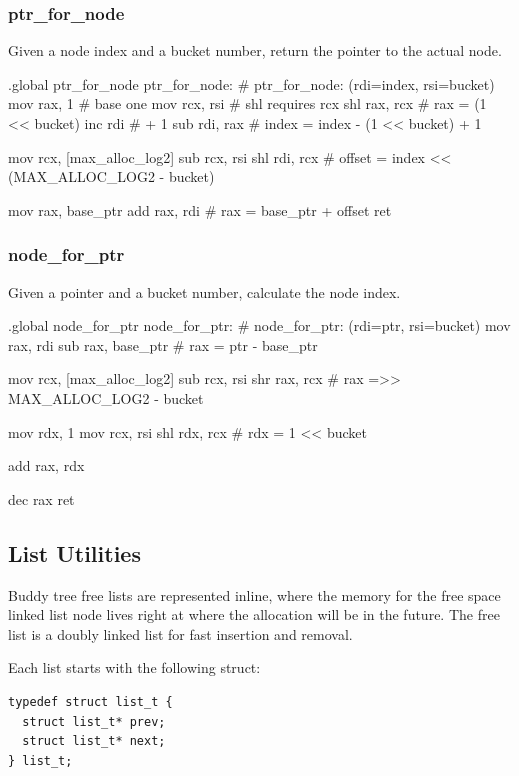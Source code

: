 \subsubsection{ptr\_for\_node}

Given a node index and a bucket number, return the pointer to the actual node.

\begin{asm}
.global ptr_for_node
ptr_for_node:			# ptr_for_node: (rdi=index, rsi=bucket)
	mov	rax, 1		#   base one
	mov	rcx, rsi	#   shl requires rcx
	shl	rax, rcx	#   rax = (1 << bucket)
	inc	rdi  		#   + 1
	sub	rdi, rax	#   index = index - (1 << bucket) + 1

	mov	rcx, [max_alloc_log2]
	sub	rcx, rsi
	shl	rdi, rcx	# offset = index << (MAX_ALLOC_LOG2 - bucket)

	mov	rax, base_ptr
	add	rax, rdi	# rax = base_ptr + offset
	ret
\end{asm}

\subsubsection{node\_for\_ptr}

Given a pointer and a bucket number, calculate the node index.

\begin{asm}
.global node_for_ptr
node_for_ptr:			# node_for_ptr: (rdi=ptr, rsi=bucket)
	mov	rax, rdi
	sub	rax, base_ptr	# rax = ptr - base_ptr

	mov	rcx, [max_alloc_log2]
	sub	rcx, rsi
	shr	rax, rcx	# rax =>> MAX_ALLOC_LOG2 - bucket

	mov	rdx, 1
	mov	rcx, rsi
	shl	rdx, rcx	# rdx = 1 << bucket

	add	rax, rdx

	dec	rax
	ret
\end{asm}

\subsection{List Utilities}

Buddy tree free lists are represented inline, where the memory for the free
space linked list node lives right at where the allocation will be in the
future. The free list is a doubly linked list for fast insertion and removal.

Each list starts with the following struct:

\begin{verbatim}
typedef struct list_t {
  struct list_t* prev;
  struct list_t* next;
} list_t;
\end{verbatim}

